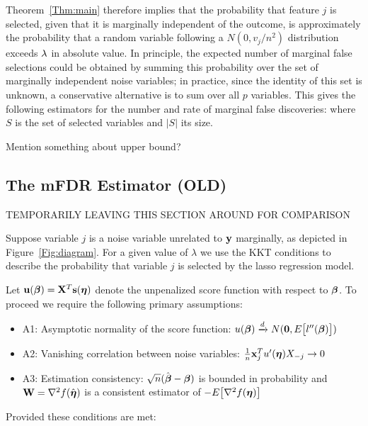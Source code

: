 Theorem~\ref{Thm:main} therefore implies that the probability that feature $j$ is selected, given that it is marginally independent of the outcome, is approximately the probability that a random variable following a $N(0, v_j/n^2)$ distribution exceeds $\lambda$ in absolute value.
In principle, the expected number of marginal false selections could be obtained by summing this probability over the set of marginally independent noise variables; in practice, since the identity of this set is unknown, a conservative alternative is to sum over all $p$ variables.
This gives the following estimators for the number and rate of marginal false discoveries:
where $S$ is the set of selected variables and $|S|$ its size.

Mention something about upper bound?

\subsection{The mFDR Estimator (OLD)}

TEMPORARILY LEAVING THIS SECTION AROUND FOR COMPARISON

Suppose variable $j$ is a noise variable unrelated to $\mathbf{y}$ marginally, as depicted in Figure~\ref{Fig:diagram}. For a given value of $\lambda$ we use the KKT conditions to describe the probability that variable $j$ is selected by the lasso regression model.

Let $\mathbf{u}(\boldsymbol{\beta}) = \mathbf{X}^T \mathbf{s}(\boldsymbol{\eta})$ denote the unpenalized score function with respect to $\boldsymbol{\beta}$.  To proceed we require the following primary assumptions:

\begin{itemize}
\item A1: Asymptotic normality of the score function: $u(\boldsymbol{\beta}) \xrightarrow{d} N(\mathbf{0},  E\big[l''(\boldsymbol{\beta})\big])$
\item A2: Vanishing correlation between noise variables: $\frac{1}{n}\mathbf{x}_j^T u'(\boldsymbol{\eta})X_{-j} \rightarrow 0$
\item A3: Estimation consistency: $\sqrt{n}(\hat{\boldsymbol{\beta}}-  \boldsymbol{\beta})$ is bounded in probability and $\mathbf{W} = \nabla^2 f(\hat{\boldsymbol{\eta}})$ is a consistent estimator of $-E\big[\nabla^2 f(\boldsymbol{\eta})\big]$
\end{itemize}

 Provided these conditions are met:

